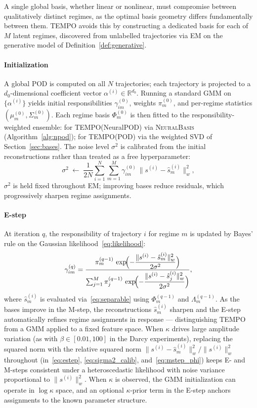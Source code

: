 \documentclass[preprint,10pt]{elsarticle}
\begin{document}
A single global basis, whether linear or nonlinear, must compromise
between qualitatively distinct regimes, as the optimal basis geometry
differs fundamentally between them.
TEMPO avoids this by constructing a dedicated basis for each of $M$
latent regimes, discovered from unlabelled trajectories via EM on
the generative model of Definition~\ref{def:generative}.

\paragraph{Initialization}
A global POD is computed on all $N$ trajectories; each trajectory is
projected to a $d_0$-dimensional coefficient vector
$\alpha^{(i)} \in \mathbb{R}^{d_0}$.
Running a standard GMM on $\{\alpha^{(i)}\}$ yields initial
responsibilities $\gamma_{im}^{(0)}$, weights $\pi_m^{(0)}$,
and per-regime statistics $(\mu_m^{(0)}, \Sigma_m^{(0)})$.
Each regime basis $\Phi_m^{(0)}$ is then fitted to the
responsibility-weighted ensemble: for TEMPO(NeuralPOD) via
\textsc{NeuralBasis} (Algorithm~\ref{alg:npod}); for TEMPO(POD)
via the weighted SVD of Section~\ref{sec:bases}.
The noise level $\sigma^2$ is calibrated from the initial
reconstructions rather than treated as a free hyperparameter:
\begin{equation}
  \sigma^2 \;\leftarrow\;
  \frac{1}{2N}\sum_{i=1}^N\sum_{m=1}^M
  \gamma_{im}^{(0)}\,\bigl\|s^{(i)} - \hat{s}_m^{(i)}\bigr\|_w^2,
  \label{eq:sigma2_calib}
\end{equation}
$\sigma^2$ is held fixed throughout EM; improving bases reduce residuals,
which progressively sharpen regime assignments.

\paragraph{E-step}
At iteration $q$, the responsibility of trajectory $i$ for regime $m$
is updated by Bayes' rule on the Gaussian likelihood~\eqref{eq:likelihood}:
\begin{equation}
  \gamma_{im}^{(q)}
  = \frac{
    \pi_m^{(q-1)}\,
    \exp\!\Bigl(-\dfrac{\|s^{(i)}-\hat{s}_m^{(i)}\|_w^2}{2\sigma^2}\Bigr)
  }{
    \sum_{j=1}^{M}
    \pi_j^{(q-1)}\,
    \exp\!\Bigl(-\dfrac{\|s^{(i)}-\hat{s}_j^{(i)}\|_w^2}{2\sigma^2}\Bigr)
  },
  \label{eq:estep}
\end{equation}
where $\hat{s}_m^{(i)}$ is evaluated via~\eqref{eq:separable}
using $\Phi_m^{(q-1)}$ and $\Lambda_m^{(q-1)}$.
As the bases improve in the M-step, the reconstructions $\hat{s}_m^{(i)}$
sharpen and the E-step automatically refines regime assignments in response —
distinguishing TEMPO from a GMM applied to a fixed feature space.
When $\kappa$ drives large amplitude variation (as with $\beta\in[0.01,100]$
in the Darcy experiments), replacing the squared norm with the relative squared norm
$\|s^{(i)}-\hat{s}_m^{(i)}\|_w^2/\|s^{(i)}\|_w^2$ throughout (in~\eqref{eq:estep},
\eqref{eq:sigma2_calib}, and~\eqref{eq:mstep_phi}) keeps E- and M-steps consistent
under a heteroscedastic likelihood with noise variance proportional to $\|s^{(i)}\|_w^2$.
When $\kappa$ is observed, the GMM initialization can operate in $\log\kappa$
space, and an optional $\kappa$-prior term in the E-step anchors assignments
to the known parameter structure.
\end{document}
